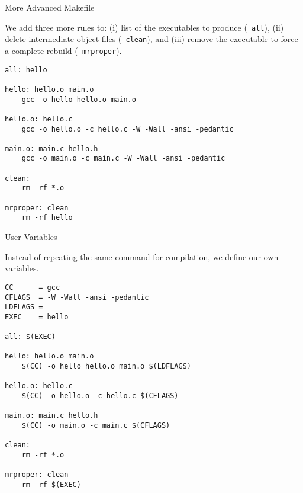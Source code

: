 \documentclass[mode=present,paper=screen,size=12pt,style=paintings]{powerdot}
\newcommand{\cc}[1]{{\tt\color{blue} #1}}
\begin{document}
\begin{slide}{More Advanced Makefile}

We add three more rules to: (i) list of the executables to produce (\cc{all}), (ii) delete intermediate object files (\cc{clean}), and (iii) remove the executable to force a complete rebuild (\cc{mrproper}).

\begin{lstlisting}
all: hello

hello: hello.o main.o
	gcc -o hello hello.o main.o

hello.o: hello.c
	gcc -o hello.o -c hello.c -W -Wall -ansi -pedantic

main.o: main.c hello.h
	gcc -o main.o -c main.c -W -Wall -ansi -pedantic

clean:
	rm -rf *.o

mrproper: clean
	rm -rf hello
\end{lstlisting}

\end{slide}


\begin{slide}{User Variables}

Instead of repeating the same command for compilation, we define our own variables.

\begin{lstlisting}
CC      = gcc
CFLAGS  = -W -Wall -ansi -pedantic
LDFLAGS =
EXEC    = hello

all: $(EXEC)

hello: hello.o main.o
	$(CC) -o hello hello.o main.o $(LDFLAGS)

hello.o: hello.c
	$(CC) -o hello.o -c hello.c $(CFLAGS)

main.o: main.c hello.h
	$(CC) -o main.o -c main.c $(CFLAGS)

clean:
	rm -rf *.o

mrproper: clean
	rm -rf $(EXEC)
\end{lstlisting}

\end{slide}
\end{document}
